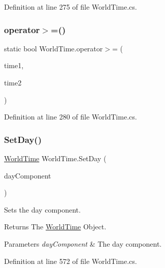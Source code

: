 Definition at line 275 of file World\+Time.\+cs.

\mbox{\label{struct_world_time_ad6f54fcbc8e3fe7ccf845994362c6f18}} 
\subsubsection{\texorpdfstring{operator$>$=()}{operator>=()}}
{\footnotesize\ttfamily static bool World\+Time.\+operator$>$= (\begin{DoxyParamCaption}\item[{\hyperlink{struct_world_time}{World\+Time}}]{time1,  }\item[{\hyperlink{struct_world_time}{World\+Time}}]{time2 }\end{DoxyParamCaption})\hspace{0.3cm}{\ttfamily [static]}}



Definition at line 280 of file World\+Time.\+cs.

\mbox{\label{struct_world_time_ad0cece460e0ef66a8bbd1de4741d99ec}} 
\subsubsection{\texorpdfstring{Set\+Day()}{SetDay()}}
{\footnotesize\ttfamily \hyperlink{struct_world_time}{World\+Time} World\+Time.\+Set\+Day (\begin{DoxyParamCaption}\item[{int}]{day\+Component }\end{DoxyParamCaption})}



Sets the day component. 

\begin{DoxyReturn}{Returns}
The \hyperlink{struct_world_time}{World\+Time} Object.
\end{DoxyReturn}

\begin{DoxyParams}{Parameters}
{\em day\+Component} & The day component.\\
\hline
\end{DoxyParams}


Definition at line 572 of file World\+Time.\+cs.

